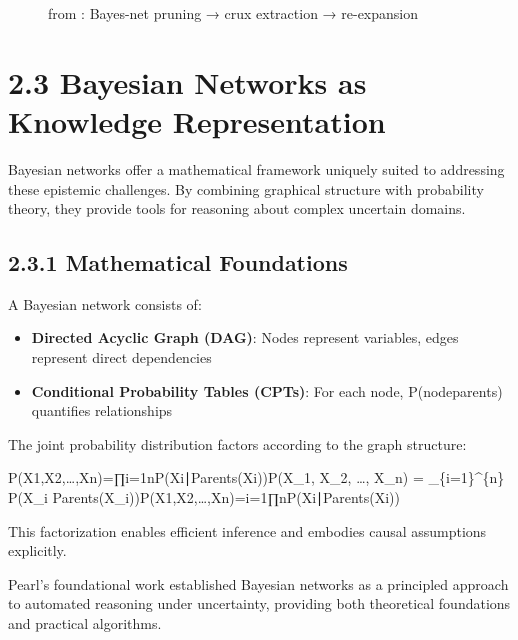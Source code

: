 \documentclass[
  11pt,
  letterpaper,
  openany]{book}
\providecommand{\tightlist}{%
  \setlength{\itemsep}{0pt}\setlength{\parskip}{0pt}}
\begin{document}
\begin{figure}
{}

\caption[Bayes-net pruning → crux extraction →
re-expansion]{\label{fig-bayesnet-crux-flow}from
\textcite{gruetzemacher2022}: Bayes-net pruning → crux extraction →
re-expansion}

\end{figure}%

\section{2.3 Bayesian Networks as Knowledge
Representation}\label{bayesian-networks-as-knowledge-representation}

Bayesian networks offer a mathematical framework uniquely suited to
addressing these epistemic challenges. By combining graphical structure
with probability theory, they provide tools for reasoning about complex
uncertain domains.

\subsection{2.3.1 Mathematical
Foundations}\label{mathematical-foundations}

A Bayesian network consists of:

\begin{itemize}
\tightlist
\item
  \textbf{Directed Acyclic Graph (DAG)}: Nodes represent variables,
  edges represent direct dependencies
\item
  \textbf{Conditional Probability Tables (CPTs)}: For each node,
  P(node\textbar parents) quantifies relationships
\end{itemize}

The joint probability distribution factors according to the graph
structure:

P(X1,X2,\ldots,Xn)=∏i=1nP(Xi∣Parents(Xi))P(X\_1, X\_2, \ldots, X\_n) =
\prod\_\{i=1\}\^{}\{n\} P(X\_i \textbar{}
Parents(X\_i))P(X1\hspace{0pt},X2\hspace{0pt},\ldots,Xn\hspace{0pt})=i=1∏n\hspace{0pt}P(Xi\hspace{0pt}∣Parents(Xi\hspace{0pt}))

This factorization enables efficient inference and embodies causal
assumptions explicitly.

Pearl's foundational work \textcite{pearl2014} established Bayesian
networks as a principled approach to automated reasoning under
uncertainty, providing both theoretical foundations and practical
algorithms.
\end{document}
